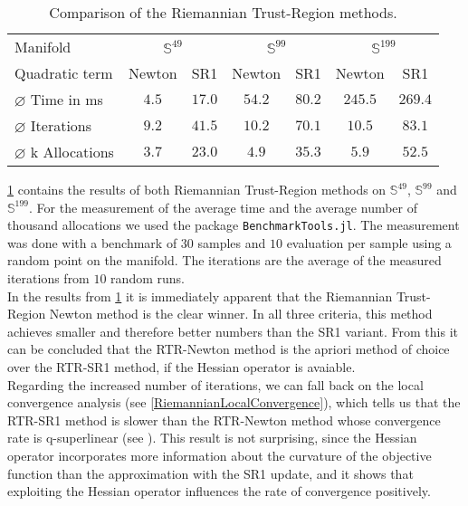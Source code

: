 \begin{table}[H]
    \centering
        \begin{tabular}{lcccccc}
            \toprule
            Manifold & \multicolumn{2}{c}{$\mathbb{S}^{49}$}& \multicolumn{2}{c}{$\mathbb{S}^{99}$} & \multicolumn{2}{c}{$\mathbb{S}^{199}$}\\ 
            \cmidrule(lr){2-3} \cmidrule(lr){4-5} \cmidrule(lr){6-7}
            Quadratic term & Newton & SR1 & Newton & SR1 & Newton & SR1 \\ 

            $\varnothing$ Time in ms & $4.5$ & $17.0$ & $54.2$ & $80.2$ & $245.5$ & $269.4$\\ 
            $\varnothing$ Iterations & $9.2$ & $41.5$ & $10.2$ & $70.1$ & $10.5$ & $83.1$ \\
            $\varnothing$ k Allocations& $3.7$ & $23.0$ & $4.9$ & $35.3$ & $5.9$ & $52.5$ \\
            \bottomrule
        \end{tabular}
    \caption{Comparison of the Riemannian Trust-Region methods.} \label{tab:Results}
\end{table}
\cref{tab:Results} contains the results of both Riemannian Trust-Region methods on $\mathbb{S}^{49}$, $\mathbb{S}^{99}$ and $\mathbb{S}^{199}$. For the measurement of the average time and the average number of thousand allocations we used the package \lstinline!BenchmarkTools.jl!. The measurement was done with a benchmark of $30$ samples and $10$ evaluation per sample using a random point on the manifold. The iterations are the average of the measured iterations from $10$ random runs. \\
In the results from \cref{tab:Results} it is immediately apparent that the Riemannian Trust-Region Newton method is the clear winner. In all three criteria, this method achieves smaller and therefore better numbers than the SR1 variant. From this it can be concluded that the RTR-Newton method is the apriori method of choice over the RTR-SR1 method, if the Hessian operator is avaiable. \\
Regarding the increased number of iterations, we can fall back on the local convergence analysis (see \cref{RiemannianLocalConvergence}), which tells us that the RTR-SR1 method is slower than the RTR-Newton method whose convergence rate is q-superlinear (see \cite[Theorem~4.13]{AbsilBakerGallivan:2007}). This result is not surprising, since the Hessian operator incorporates more information about the curvature of the objective function than the approximation with the SR1 update, and it shows that exploiting the Hessian operator influences the rate of convergence positively. \\ 
